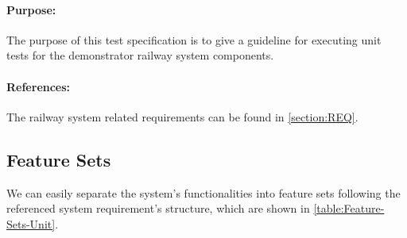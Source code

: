 \paragraph{Purpose:} The purpose of this test specification is to give a guideline for executing unit tests for the demonstrator railway system components.
\paragraph{References:} The railway system related requirements can be found in \autoref{section:REQ}.

\subsection{Feature Sets} We can easily separate the system's functionalities into feature sets following the referenced system requirement's structure, which are shown in \autoref{table:Feature-Sets-Unit}.
